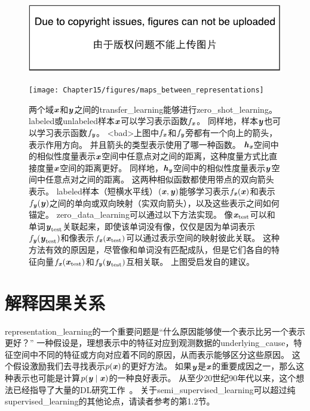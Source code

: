 \begin{figure}[!htb]
\ifOpenSource
\centerline{\includegraphics{figure.pdf}}
\else
\centerline{\texttt{[image: Chapter15/figures/maps\_between\_representations]}}
\fi
\caption{两个域$\boldsymbol{\mathit{x}}$和$\boldsymbol{\mathit{y}}$之间的\gls{transfer_learning}能够进行\gls{zero_shot_learning}。
\gls{labeled}或\gls{unlabeled}样本$\boldsymbol{\mathit{x}}$可以学习表示函数$f_{\boldsymbol{\mathit{x}}}$。
同样地，样本$\boldsymbol{\mathit{y}}$也可以学习表示函数$f_{\boldsymbol{\mathit{y}}}$。
<bad>上图中$f_{\boldsymbol{\mathit{x}}}$和$f_{\boldsymbol{\mathit{y}}}$旁都有一个向上的箭头，表示作用方向。
并且箭头的类型表示使用了哪一种函数。
$\boldsymbol{\mathit{h}}_{\boldsymbol{\mathit{x}}}$空间中的相似性度量表示$\boldsymbol{\mathit{x}}$空间中任意点对之间的距离，这种度量方式比直接度量$\boldsymbol{\mathit{x}}$空间的距离更好。
同样地，$\boldsymbol{\mathit{h}}_{\boldsymbol{\mathit{y}}}$空间中的相似性度量表示$\boldsymbol{\mathit{y}}$空间中任意点对之间的距离。
这两种相似函数都使用带点的双向箭头表示。
\gls{labeled}样本（短横水平线）$(\boldsymbol{\mathit{x}}, \boldsymbol{\mathit{y}})$能够学习表示$f_{\boldsymbol{\mathit{x}}}(\boldsymbol{\mathit{x}})$和表示$f_{\boldsymbol{\mathit{y}}}(\boldsymbol{\mathit{y}})$之间的单向或双向映射（实双向箭头），以及这些表示之间如何锚定。
\gls{zero_data_learning}可以通过以下方法实现。
像$\boldsymbol{\mathit{x}}_{\text{test}}$可以和单词$\boldsymbol{\mathit{y}}_{\text{test}}$关联起来，即使该单词没有像，仅仅是因为单词表示$f_{\boldsymbol{\mathit{y}}}(\boldsymbol{\mathit{y}}_{\text{test}})$和像表示$f_{\boldsymbol{\mathit{x}}}(\boldsymbol{\mathit{x}}_{\text{test}})$可以通过表示空间的映射彼此关联。
这种方法有效的原因是，尽管像和单词没有匹配成队，但是它们各自的特征向量$f_{\boldsymbol{\mathit{x}}}(\boldsymbol{\mathit{x}}_{\text{test}})$和$f_{\boldsymbol{\mathit{y}}}(\boldsymbol{\mathit{y}}_{\text{test}})$互相关联。
上图受启发自的建议。
}
\label{fig:chap15_maps_between_representations}
\end{figure}


\section{解释因果关系}
\label{sec:semi_supervised_disentangling_of_causal_factors}

\gls{representation_learning}的一个重要问题是``什么原因能够使一个表示比另一个表示更好？''
一种假设是，理想表示中的特征对应到观测数据的\gls{underlying_cause}，特征空间中不同的特征或方向对应着不同的原因，从而表示能够区分这些原因。
这个假设激励我们去寻找表示$p(\boldsymbol{\mathit{x}})$的更好方法。
如果$\boldsymbol{\mathit{y}}$是$\boldsymbol{\mathit{x}}$的重要成因之一，那么这种表示也可能是计算$p(\boldsymbol{\mathit{y}} \mid \boldsymbol{\mathit{x}})$的一种良好表示。
从至少20世纪90年代以来，这个想法已经指导了大量的\gls{DL}研究工作~\citep{Becker92,hinton1999unsupervised}。%
关于\gls{semi_supervised_learning}可以超过纯\gls{supervised_learning}的其他论点，请读者参考\cite{Chapelle-2006}的第1.2节。

